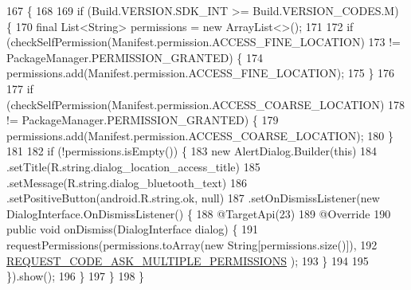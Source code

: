 \begin{DoxyCode}
167                                            \{
168 
169         \textcolor{keywordflow}{if} (Build.VERSION.SDK\_INT >= Build.VERSION\_CODES.M) \{
170             \textcolor{keyword}{final} List<String> permissions = \textcolor{keyword}{new} ArrayList<>();
171 
172             \textcolor{keywordflow}{if} (checkSelfPermission(Manifest.permission.ACCESS\_FINE\_LOCATION)
173                     != PackageManager.PERMISSION\_GRANTED) \{
174                 permissions.add(Manifest.permission.ACCESS\_FINE\_LOCATION);
175             \}
176 
177             \textcolor{keywordflow}{if} (checkSelfPermission(Manifest.permission.ACCESS\_COARSE\_LOCATION)
178                     != PackageManager.PERMISSION\_GRANTED) \{
179                 permissions.add(Manifest.permission.ACCESS\_COARSE\_LOCATION);
180             \}
181 
182             \textcolor{keywordflow}{if} (!permissions.isEmpty()) \{
183                 \textcolor{keyword}{new} AlertDialog.Builder(\textcolor{keyword}{this})
184                         .setTitle(R.string.dialog\_location\_access\_title)
185                         .setMessage(R.string.dialog\_bluetooth\_text)
186                         .setPositiveButton(android.R.string.ok, null)
187                         .setOnDismissListener(\textcolor{keyword}{new} DialogInterface.OnDismissListener() \{
188                             @TargetApi(23)
189                             @Override
190                             \textcolor{keyword}{public} \textcolor{keywordtype}{void} onDismiss(DialogInterface dialog) \{
191                                 requestPermissions(permissions.toArray(\textcolor{keyword}{new} String[permissions.size()]),
192                                         \hyperlink{classit_1_1unibo_1_1torsello_1_1bluetoothpositioning_1_1activities_1_1MainActivity_a319aed5cdd5724e043302babe5fcfeac_a319aed5cdd5724e043302babe5fcfeac}{REQUEST\_CODE\_ASK\_MULTIPLE\_PERMISSIONS}
      );
193                             \}
194 
195                         \}).show();
196             \}
197         \}
198     \}
\end{DoxyCode}
\hypertarget{classit_1_1unibo_1_1torsello_1_1bluetoothpositioning_1_1activities_1_1MainActivity_ab0010b6d3fe518fabfea843626d7b5f1_ab0010b6d3fe518fabfea843626d7b5f1}{}\label{classit_1_1unibo_1_1torsello_1_1bluetoothpositioning_1_1activities_1_1MainActivity_ab0010b6d3fe518fabfea843626d7b5f1_ab0010b6d3fe518fabfea843626d7b5f1} 
